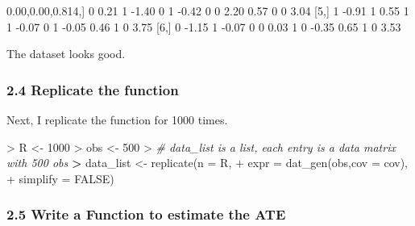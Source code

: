 \documentclass[
]{article}
\newenvironment{Shaded}{\begin{snugshade}}{\end{snugshade}}
\newcommand{\AttributeTok}[1]{\textcolor[rgb]{0.77,0.63,0.00}{#1}}
\newcommand{\CommentTok}[1]{\textcolor[rgb]{0.56,0.35,0.01}{\textit{#1}}}
\newcommand{\ConstantTok}[1]{\textcolor[rgb]{0.00,0.00,0.00}{#1}}
\newcommand{\DecValTok}[1]{\textcolor[rgb]{0.00,0.00,0.81}{#1}}
\newcommand{\ErrorTok}[1]{\textcolor[rgb]{0.64,0.00,0.00}{\textbf{#1}}}
\newcommand{\FloatTok}[1]{\textcolor[rgb]{0.00,0.00,0.81}{#1}}
\newcommand{\FunctionTok}[1]{\textcolor[rgb]{0.00,0.00,0.00}{#1}}
\newcommand{\NormalTok}[1]{#1}
\newcommand{\OtherTok}[1]{\textcolor[rgb]{0.56,0.35,0.01}{#1}}
\newcommand{\SpecialCharTok}[1]{\textcolor[rgb]{0.00,0.00,0.00}{#1}}
\begin{document}
\begin{Shaded}
\begin{Highlighting}[]
\NormalTok{[}\DecValTok{4}\NormalTok{,] }\DecValTok{0}  \FloatTok{0.21} \DecValTok{1} \SpecialCharTok{{-}}\FloatTok{1.40} \DecValTok{0} \DecValTok{1} \SpecialCharTok{{-}}\FloatTok{0.42} \DecValTok{0} \DecValTok{0}  \FloatTok{2.20} \FloatTok{0.57}      \DecValTok{0}     \DecValTok{0}      \FloatTok{3.04}
\NormalTok{[}\DecValTok{5}\NormalTok{,] }\DecValTok{1} \SpecialCharTok{{-}}\FloatTok{0.91} \DecValTok{1}  \FloatTok{0.55} \DecValTok{1} \DecValTok{1} \SpecialCharTok{{-}}\FloatTok{0.07} \DecValTok{0} \DecValTok{1} \SpecialCharTok{{-}}\FloatTok{0.05} \FloatTok{0.46}      \DecValTok{1}     \DecValTok{0}      \FloatTok{3.75}
\NormalTok{[}\DecValTok{6}\NormalTok{,] }\DecValTok{0} \SpecialCharTok{{-}}\FloatTok{1.15} \DecValTok{1} \SpecialCharTok{{-}}\FloatTok{0.07} \DecValTok{0} \DecValTok{0}  \FloatTok{0.03} \DecValTok{1} \DecValTok{0} \SpecialCharTok{{-}}\FloatTok{0.35} \FloatTok{0.65}      \DecValTok{1}     \DecValTok{0}      \FloatTok{3.53}
\end{Highlighting}
\end{Shaded}

The dataset looks good.

\hypertarget{replicate-the-function}{%
\subsubsection{2.4 Replicate the
function}\label{replicate-the-function}}

Next, I replicate the function for 1000 times.

\begin{Shaded}
\begin{Highlighting}[]
\SpecialCharTok{\textgreater{}}\NormalTok{ R }\OtherTok{\textless{}{-}} \DecValTok{1000}
\SpecialCharTok{\textgreater{}}\NormalTok{ obs }\OtherTok{\textless{}{-}} \DecValTok{500}
\SpecialCharTok{\textgreater{}} \CommentTok{\# data\_list is a list, each entry is a data matrix with 500 obs}
\ErrorTok{\textgreater{}}\NormalTok{ data\_list }\OtherTok{\textless{}{-}} \FunctionTok{replicate}\NormalTok{(}\AttributeTok{n =}\NormalTok{ R,}
\SpecialCharTok{+}                        \AttributeTok{expr =} \FunctionTok{dat\_gen}\NormalTok{(obs,}\AttributeTok{cov =}\NormalTok{ cov),}
\SpecialCharTok{+}                        \AttributeTok{simplify =} \ConstantTok{FALSE}\NormalTok{)}
\end{Highlighting}
\end{Shaded}

\hypertarget{write-a-function-to-estimate-the-ate}{%
\subsubsection{2.5 Write a Function to estimate the
ATE}\label{write-a-function-to-estimate-the-ate}}
\end{document}
